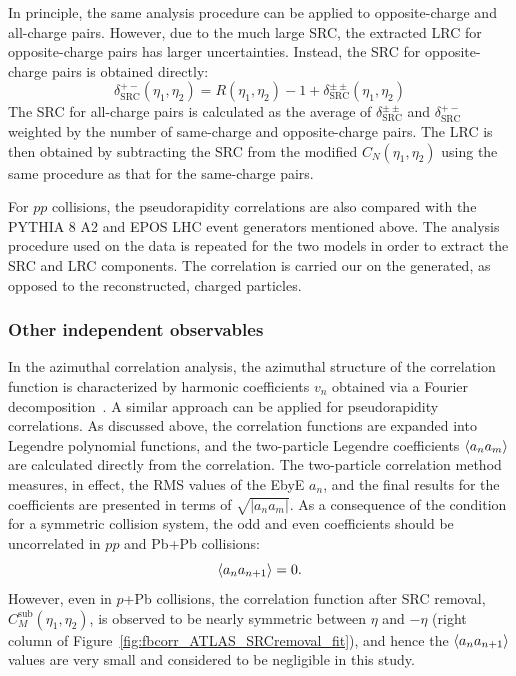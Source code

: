 In principle, the same analysis procedure can be applied to opposite-charge and all-charge pairs. However, due to the much large SRC, the extracted LRC for opposite-charge pairs has larger uncertainties. Instead, the SRC for opposite-charge pairs is obtained directly:
\begin{equation}
\delta_\text{SRC}^{+-}(\eta_1, \eta_2) = R(\eta_1, \eta_2) - 1 + \delta_\text{SRC}^{\pm\pm}(\eta_1, \eta_2)
\end{equation}
The SRC for all-charge pairs is calculated as the average of $\delta_\text{SRC}^{\pm\pm}$ and $\delta_\text{SRC}^{+-}$ weighted by the number of same-charge and opposite-charge pairs. The LRC is then obtained by subtracting the SRC from the modified $C_N(\eta_1, \eta_2)$ using the same procedure as that for the same-charge pairs.

For $pp$ collisions, the pseudorapidity correlations are also compared with the PYTHIA 8 A2 and EPOS LHC event generators mentioned above. The analysis procedure used on the data is repeated for the two models in order to extract the SRC and LRC components. The correlation is carried our on the generated, as opposed to the reconstructed, charged particles.



\subsubsection{Other independent observables}
\label{sec:fb_other_observables}

In the azimuthal correlation analysis, the azimuthal structure of the correlation function is characterized by harmonic coefficients $v_n$ obtained via a Fourier decomposition~\cite{ATLAS:2012at, Aamodt:2011by}. A similar approach can be applied for pseudorapidity correlations. As discussed above, the correlation functions are expanded into Legendre polynomial functions, and the two-particle Legendre coefficients $\left\langle a_n a_m\right\rangle$ are calculated directly from the correlation. The two-particle correlation method measures, in effect, the RMS values of the EbyE $a_n$, and the final results for the coefficients are presented in terms of $\sqrt{|a_n a_m|}$. As a consequence of the condition for a symmetric collision system, the odd and even coefficients should be uncorrelated in $pp$ and Pb+Pb collisions:
\begin{equation}
\left\langle a_n a_{n+1}\right\rangle = 0.
\end{equation}
However, even in $p$+Pb collisions, the correlation function after SRC removal, $C_M^\text{sub}(\eta_1, \eta_2)$, is observed to be nearly symmetric between $\eta$ and $-\eta$ (right column of Figure~\ref{fig:fbcorr_ATLAS_SRCremoval_fit}), and hence the $\left\langle a_n a_{n+1}\right\rangle$ values are very small and considered to be negligible in this study.

